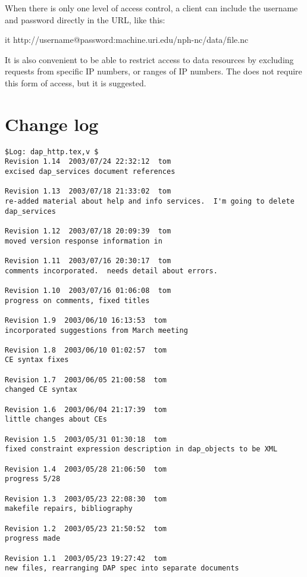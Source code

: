 \documentclass[justify]{dods-paper}
\begin{document}
When there is only one level of access control, a client can include
the username and password directly in the \DAP URL, like this:

\begin{vcode}{it}
http://username@password:machine.uri.edu/nph-nc/data/file.nc  
\end{vcode}

It is also convenient to be able to restrict access to data resources
by excluding requests from specific IP numbers, or ranges of IP
numbers.  The \DAP does not require this form of access, but it is
suggested. 



\appendix


\T{}
\T\raggedright


\section{Change log}

\begin{verbatim}
$Log: dap_http.tex,v $
Revision 1.14  2003/07/24 22:32:12  tom
excised dap_services document references

Revision 1.13  2003/07/18 21:33:02  tom
re-added material about help and info services.  I'm going to delete dap_services

Revision 1.12  2003/07/18 20:09:39  tom
moved version response information in

Revision 1.11  2003/07/16 20:30:17  tom
comments incorporated.  needs detail about errors.

Revision 1.10  2003/07/16 01:06:08  tom
progress on comments, fixed titles

Revision 1.9  2003/06/10 16:13:53  tom
incorporated suggestions from March meeting

Revision 1.8  2003/06/10 01:02:57  tom
CE syntax fixes

Revision 1.7  2003/06/05 21:00:58  tom
changed CE syntax

Revision 1.6  2003/06/04 21:17:39  tom
little changes about CEs

Revision 1.5  2003/05/31 01:30:18  tom
fixed constraint expression description in dap_objects to be XML

Revision 1.4  2003/05/28 21:06:50  tom
progress 5/28

Revision 1.3  2003/05/23 22:08:30  tom
makefile repairs, bibliography

Revision 1.2  2003/05/23 21:50:52  tom
progress made

Revision 1.1  2003/05/23 19:27:42  tom
new files, rearranging DAP spec into separate documents


\end{verbatim}
\end{document}
